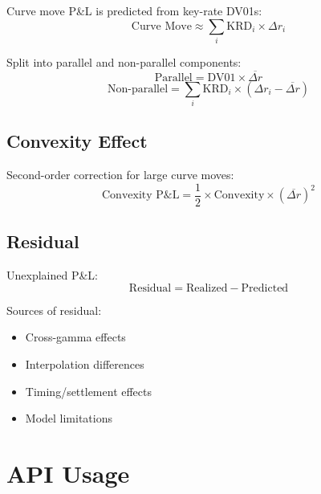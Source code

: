 \documentclass[12pt,a4paper]{report}
\begin{document}
Curve move P\&L is predicted from key-rate DV01s:
\begin{equation}
    \text{Curve Move} \approx \sum_{i} \text{KRD}_i \times \Delta r_i
\end{equation}

Split into parallel and non-parallel components:
\begin{equation}
    \text{Parallel} = \text{DV01} \times \overline{\Delta r}
\end{equation}
\begin{equation}
    \text{Non-parallel} = \sum_{i} \text{KRD}_i \times (\Delta r_i - \overline{\Delta r})
\end{equation}

\subsection{Convexity Effect}

Second-order correction for large curve moves:
\begin{equation}
    \text{Convexity P\&L} = \frac{1}{2} \times \text{Convexity} \times (\overline{\Delta r})^2
\end{equation}

\subsection{Residual}

Unexplained P\&L:
\begin{equation}
    \text{Residual} = \text{Realized} - \text{Predicted}
\end{equation}

Sources of residual:
\begin{itemize}
    \item Cross-gamma effects
    \item Interpolation differences
    \item Timing/settlement effects
    \item Model limitations
\end{itemize}

\section{API Usage}
\end{document}
